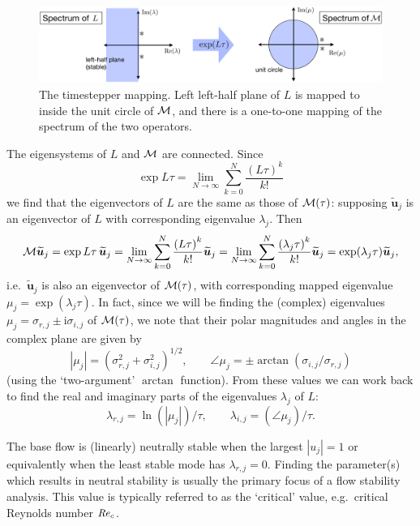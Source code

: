 \documentclass[11pt,a4paper]{report}
\newcommand\Rey{\mbox{\textit{Re}}}
\newcommand\ci{\mathrm{i}}
\newcommand\wt[1]{\widetilde{#1}}
\newcommand{\ie}{i.e.\ }
\newcommand{\eg}{e.g.\ }
\newcommand\Lop{{L}}
\newcommand\Mop{{\cal M}}
\begin{document}
\begin{figure}
\begin{center}
\includegraphics[width=\textwidth]{mapping}
\end{center}
\caption{The timestepper mapping. Left left-half plane of $\Lop$ is
  mapped to inside the unit circle of $\Mop$, and there is a
  one-to-one mapping of the spectrum of the two operators.}
\label{fig.map}
\end{figure}

The eigensystems of $\Lop$ and $\Mop$ are connected.  Since
\begin{equation}
\exp \Lop\tau =
\lim_{N\to\infty}
\sum_{k=0}^{N}
\frac{\left(\Lop\tau\right)^k}{k!}
\end{equation}
we find that the eigenvectors of $\Lop$ are the same as those of
$\Mop(\tau)$: supposing $\wt{\bm{u}}_j$ is an eigenvector of $\Lop$ with
corresponding eigenvalue $\lambda_j$.  Then
\begin{equation}
\Mop\wt{\bm{u}}_j=
\exp \Lop\tau\,\wt{\bm{u}}_j=
\lim_{N\to\infty}\sum_{k=0}^N\frac{\left(\Lop\tau\right)^k}{k!}\wt{\bm{u}}_j=
\lim_{N\to\infty}\sum_{k=0}^N\frac{\left(\lambda_j \tau\right)^k}{k!}\wt{\bm{u}}_j=
\exp(\lambda_j\tau)\wt{\bm{u}}_j,
\end{equation}
\ie $\wt{\bm{u}}_j$ is also an eigenvector of $\Mop(\tau)$, with
corresponding mapped eigenvalue $\mu_j=\exp(\lambda_j\tau)$.  In fact,
since we will be finding the (complex) eigenvalues
$\mu_j=\sigma_{r,j}\pm\ci\sigma_{i,j}$ of $\Mop(\tau)$, we note that
their polar magnitudes and angles in the complex plane are given by
\begin{equation}
|\mu_j|=(\sigma_{r,j}^2+\sigma_{i,j}^2)^{1/2},\qquad
\angle\mu_j=\pm\arctan(\sigma_{i,j}/\sigma_{r,j})
\end{equation}
(using the `two-argument' $\arctan$ function).  From these values we
can work back to find the real and imaginary parts of the eigenvalues
$\lambda_j$ of $\Lop$:
\begin{equation}
\lambda_{r,j}=\ln(|\mu_j|)/\tau,\qquad
\lambda_{i,j}=(\angle\mu_j)/\tau.
\label{eq.convert}
\end{equation}

The base flow is (linearly) neutrally stable when the largest
$|u_j|=1$ or equivalently when the least stable mode has
$\lambda_{r,j}=0$.  Finding the parameter(s) which results in neutral
stability is usually the primary focus of a flow stability
analysis. This value is typically referred to as the `critical' value,
\eg critical Reynolds number $\Rey_c$.
\end{document}
